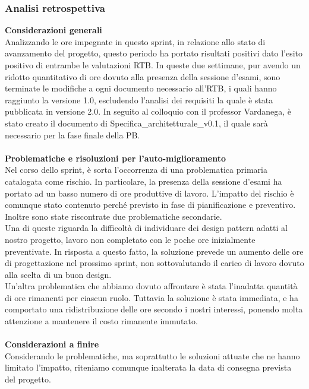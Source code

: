 \newpage
\subsubsection{Analisi retrospettiva}

\textbf{Considerazioni generali}\\Analizzando le ore impegnate in questo sprint, in relazione allo stato di avanzamento del progetto, questo periodo ha portato risultati positivi dato l'esito positivo di entrambe le valutazioni RTB. In queste due settimane, pur avendo un ridotto quantitativo di ore dovuto alla presenza della sessione d'esami, sono terminate le modifiche a ogni documento necessario all'RTB, i quali hanno raggiunto la versione 1.0, escludendo l'analisi dei requisiti la quale è stata pubblicata in versione 2.0. In seguito al colloquio con il professor Vardanega, è stato creato il documento di Specifica\_architetturale\_v0.1, il quale sarà necessario per la fase finale della PB. \\ \\
\textbf{Problematiche e risoluzioni per l'auto-miglioramento}\\Nel corso dello sprint, è sorta l'occorrenza di una problematica primaria catalogata come rischio. In particolare, la presenza della sessione d'esami ha portato ad un basso numero di ore produttive di lavoro. L'impatto del rischio è comunque stato contenuto perché previsto in fase di pianificazione e preventivo.\\Inoltre sono state riscontrate due problematiche secondarie.\\
Una di queste riguarda la difficoltà di individuare dei design pattern adatti al nostro progetto, lavoro non completato con le poche ore inizialmente preventivate. In risposta a questo fatto, la soluzione prevede un aumento delle ore di progettazione nel prossimo sprint, non sottovalutando il carico di lavoro dovuto alla scelta di un buon design.\\
Un'altra problematica che abbiamo dovuto affrontare è stata l'inadatta quantità di ore rimanenti per ciascun ruolo. Tuttavia la soluzione è stata immediata, e ha comportato una ridistribuzione delle ore secondo i nostri interessi, ponendo molta attenzione a mantenere il costo rimanente immutato.\\   \\
\textbf{Considerazioni a finire}\\Considerando le problematiche, ma soprattutto le soluzioni attuate che ne hanno limitato l'impatto, riteniamo comunque inalterata la data di consegna prevista del progetto.


